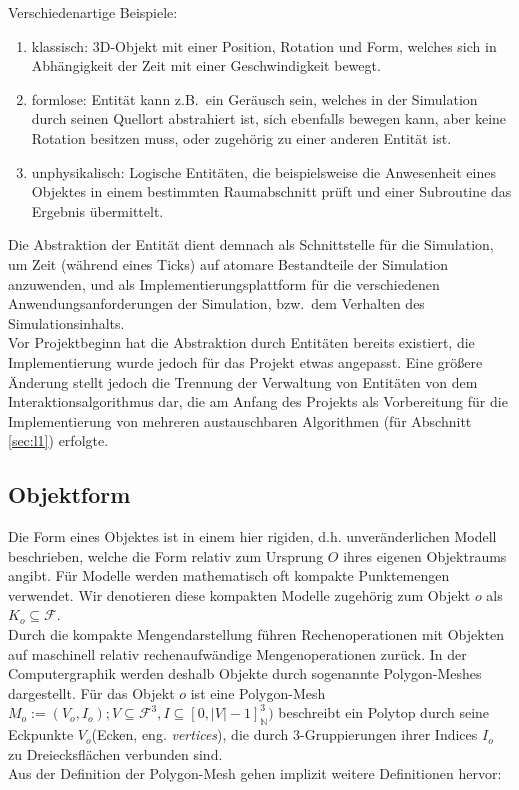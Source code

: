 Verschiedenartige Beispiele:
\begin{enumerate}
\item klassisch: 3D-Objekt mit einer Position, Rotation und Form, welches sich in Abhängigkeit der Zeit mit einer Geschwindigkeit bewegt.\\
\item formlose: Entität kann z.B.~ein Geräusch sein, welches in der Simulation durch seinen Quellort abstrahiert ist, sich ebenfalls bewegen kann, aber keine Rotation besitzen muss, oder zugehörig zu einer anderen Entität ist.
\item unphysikalisch: Logische Entitäten, die beispielsweise die Anwesenheit eines Objektes in einem bestimmten Raumabschnitt prüft und einer Subroutine das Ergebnis übermittelt.
\end{enumerate}
Die Abstraktion der Entität dient demnach als Schnittstelle für die Simulation, um Zeit (während eines Ticks) auf atomare Bestandteile der Simulation anzuwenden, und als Implementierungsplattform für die verschiedenen Anwendungsanforderungen der Simulation, bzw.~dem Verhalten des Simulationsinhalts.\\

Vor Projektbeginn hat die Abstraktion durch Entitäten bereits existiert, die Implementierung wurde jedoch für das Projekt etwas angepasst. Eine größere Änderung stellt jedoch die Trennung der Verwaltung von Entitäten von dem Interaktionsalgorithmus dar, die am Anfang des Projekts als Vorbereitung für die Implementierung von mehreren austauschbaren Algorithmen (für Abschnitt \ref{sec:l1}) erfolgte.

\subsection{Objektform}
\label{object_form}
Die Form eines Objektes ist in einem hier rigiden, d.h. unveränderlichen Modell beschrieben, welche die Form relativ zum Ursprung $O$ ihres eigenen Objektraums angibt.
Für Modelle werden mathematisch oft kompakte Punktemengen verwendet. Wir denotieren diese kompakten Modelle zugehörig zum Objekt $o$ als $ K_o \subseteq \mathcal{F}$.\\

Durch die kompakte Mengendarstellung führen Rechenoperationen mit Objekten auf maschinell relativ rechenaufwändige Mengenoperationen zurück. In der Computergraphik werden deshalb Objekte durch sogenannte Polygon-Meshes dargestellt. 
Für das Objekt $o$ ist eine Polygon-Mesh $M_o := (V_o, I_o); V \subseteq \mathcal{F}^3, I \subseteq [0, |V|-1]_\mathbb{N}^3 )$ beschreibt ein Polytop durch seine Eckpunkte $V_o$(Ecken, eng. \textit{vertices}), die durch 3-Gruppierungen ihrer Indices $I_o$ zu Dreiecksflächen verbunden sind.\\
Aus der Definition der Polygon-Mesh gehen implizit weitere Definitionen hervor:

